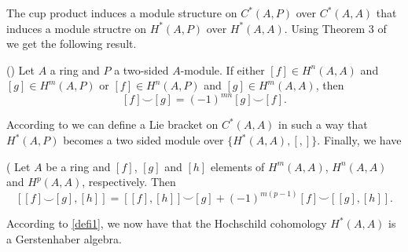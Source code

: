 \documentclass[TFM.tex]{subfiles}
\begin{document}
The cup product induces a module structure on $C^*(A,P)$ over $C^*(A,A)$ that induces a module structre on $H^*(A,P)$ over $H^*(A,A)$. Using Theorem 3 of \cite{Gerstenhaber} we get the following result.

\begin{thm}(\cite[Corollary 2 of ]{Gerstenhaber})
Let $A$ a ring and $P$ a two-sided $A$-module. If either $[f]\in H^n(A,A)$ and $[g]\in H^m(A,P)$ or $[f]\in H^n(A,P)$ and $[g]\in H^m(A,A)$, then
\[
[f]\smile[g]=(-1)^{mn}[g]\smile [f].
\]
\end{thm}

According to \cite[Theorem 4 of ]{Gerstenhaber} we can define a Lie bracket on $C^*(A,A)$ in such a way that $H^*(A,P)$ becomes a two sided module over $\{H^*(A,A),[,]\}$. Finally, we have

\begin{thm}(\cite[Corollary 2 of ]{Gerstenhaber}
Let $A$ be a ring and $[f]$, $[g]$ and $[h]$ elements of $H^m(A,A)$, $H^n(A,A)$ and $H^p(A,A)$, respectively. Then
\[
[[f]\smile[g], [h]]=[[f],[h]]\smile [g]+(-1)^{m(p-1)}[f]\smile[[g],[h]].
\]
\end{thm}


According to \ref{defi1}, we now have that the Hochschild cohomology $H^*(A,A)$ is a Gerstenhaber algebra. 
\end{document}
